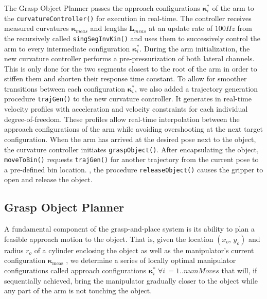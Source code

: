 The Grasp Object Planner passes the approach configurations $\boldsymbol{\kappa}_i^*$ of the arm to the \texttt{curvatureController()} for execution in real-time.
The controller receives measured curvatures $\boldsymbol{\kappa}_{meas}$ and lengths $\boldsymbol{L}_{meas}$ at an update rate of $100\unit{Hz}$ from the recursively called \texttt{singSegInvKin()} and uses them to successively control the arm to every intermediate configuration $\boldsymbol{\kappa}_i^*$.
During the arm initialization, the new curvature controller performs a pre-pressurization of both lateral channels. 
This is only done for the two segments closest to the root of the arm in order to stiffen them and shorten their response time constant.  
To allow for smoother transitions between each configuration $\boldsymbol{\kappa}_i^*$, we also added a trajectory generation procedure \texttt{trajGen()} to the new curvature controller. It generates in real-time velocity profiles with acceleration and velocity constraints for each individual degree-of-freedom.
These profiles allow real-time interpolation between the approach configurations of the arm while avoiding overshooting at the next target configuration.
When the arm has arrived at the desired pose next to the object, the curvature controller initiates \texttt{graspObject()}.
After encapsulating the object, \texttt{moveToBin()} requests \texttt{trajGen()} for another trajectory from the current pose to a pre-defined bin location.
, the procedure \texttt{releaseObject()} causes the gripper to open and release the object.

\subsection{Grasp Object Planner}
\label{subsec:grasp_planner}
A fundamental component of the grasp-and-place system is its ability to plan a feasible approach motion to the object.
That is, given the location $\left(x_o, \, y_o\right)$ and radius $r_o$ of a cylinder enclosing the object as well as the manipulator's current configuration $\boldsymbol{\kappa}_{\textrm{meas}}$ , we determine a series of locally optimal manipulator configurations called approach configurations $\boldsymbol{\kappa}_i^* \; \forall i \, = 1.. numMoves$ that will, if sequentially achieved, bring the manipulator gradually closer to the object while any part of the arm is not touching the object.

